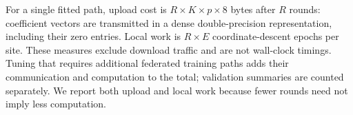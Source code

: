 For a single fitted path, upload cost is $R\times K\times p\times8$ bytes
after $R$ rounds: coefficient vectors are transmitted in a dense
double-precision representation, including their zero entries. Local
work is $R\times E$ coordinate-descent epochs per site. These measures
exclude download traffic and are not wall-clock timings. Tuning that
requires additional federated training paths adds their communication and
computation to the total; validation summaries are counted separately. We report both
upload and local work because fewer rounds need not imply less computation.
